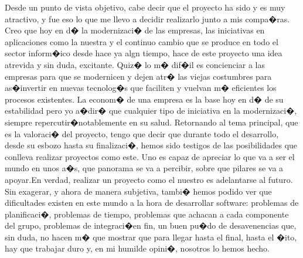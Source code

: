 Desde un punto de vista objetivo, cabe decir que el proyecto ha sido y es muy atractivo, y fue eso lo que me llevo a decidir realizarlo junto a mis compa�ras. Creo que hoy en d� la modernizaci� de las empresas, las iniciativas en aplicaciones como la nuestra y el continuo cambio que se produce en todo el sector inform�ico desde hace ya algn tiempo, hace de este proyecto una idea atrevida y sin duda, excitante. Quiz� lo m� dif�il es concienciar a las empresas para que se modernicen y dejen atr� las viejas costumbres para as�invertir en nuevas tecnolog�s que faciliten y vuelvan m� eficientes los procesos existentes. La econom� de una empresa es la base hoy en d� de su estabilidad pero yo a�dir� que cualquier tipo de iniciativa en la modernizaci�, siempre repercutir�notablemente en su salud. 
Retornando al tema principal, que es la valoraci� del proyecto, tengo que decir que durante todo el desarrollo, desde su esbozo hasta su finalizaci�, hemos sido testigos de las posibilidades que conlleva realizar proyectos como este. Uno es capaz de apreciar lo que va a ser el mundo en unos a�s, que panorama se va a percibir, sobre que pilares se va a apoyar.En verdad, realizar un proyecto como el nuestro es adelantarse al futuro. Sin exagerar, y ahora de manera subjetiva, tambi� hemos podido ver que dificultades existen en este mundo a la hora de desarrollar software: problemas de planificaci�, problemas de tiempo, problemas que achacan a cada componente del grupo, problemas de integraci�en fin, un buen pu�do de desavenencias que, sin duda, no hacen m� que mostrar que para llegar hasta el final, hasta el �ito, hay que trabajar duro y, en mi humilde opini�, nosotros lo hemos hecho. 